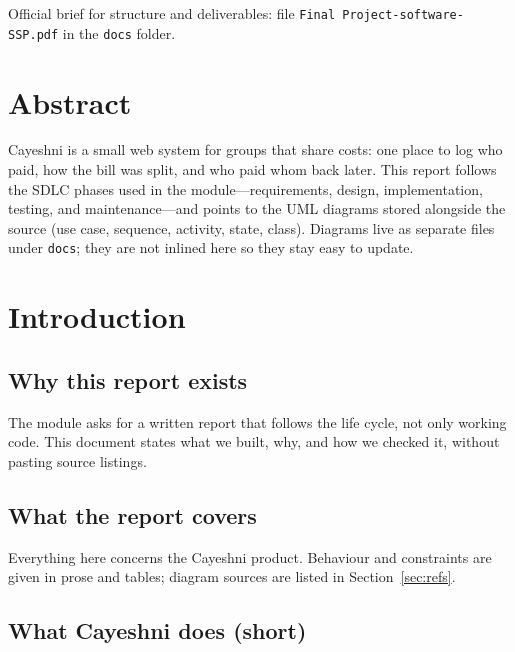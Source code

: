 \documentclass[11pt,a4paper]{article}
\begin{document}
\vspace{0.75em}
\noindent Official brief for structure and deliverables: file \texttt{Final Project-software- SSP.pdf} in the \texttt{docs} folder.

\section{Abstract}

Cayeshni is a small web system for groups that share costs: one place to log who paid, how the bill was split, and who paid whom back later. This report follows the SDLC phases used in the module---requirements, design, implementation, testing, and maintenance---and points to the UML diagrams stored alongside the source (use case, sequence, activity, state, class). Diagrams live as separate files under \texttt{docs}; they are not inlined here so they stay easy to update.

\section{Introduction}

\subsection{Why this report exists}

The module asks for a written report that follows the life cycle, not only working code. This document states what we built, why, and how we checked it, without pasting source listings.

\subsection{What the report covers}

Everything here concerns the Cayeshni product. Behaviour and constraints are given in prose and tables; diagram sources are listed in Section~\ref{sec:refs}.

\subsection{What Cayeshni does (short)}
\end{document}
